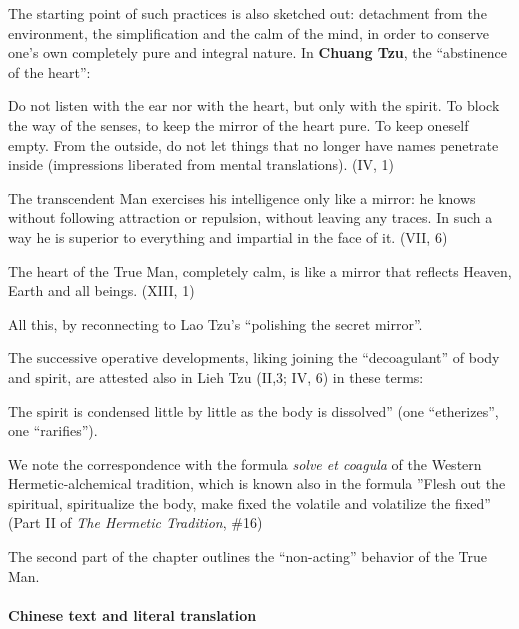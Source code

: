 The starting point of such practices is also sketched out: detachment from the environment, the simplification and the calm of the mind, in order to conserve one's own completely pure and integral nature. In \textbf{Chuang Tzu}, the ``abstinence of the heart'':


\begin{quotex}
Do not listen with the ear nor with the heart, but only with the spirit. To block the way of the senses, to keep the mirror of the heart pure. To keep oneself empty. From the outside, do not let things that no longer have names penetrate inside (impressions liberated from mental translations). (IV, 1)
\end{quotex}


\begin{quotex}
The transcendent Man exercises his intelligence only like a mirror: he knows without following attraction or repulsion, without leaving any traces. In such a way he is superior to everything and impartial in the face of it. (VII, 6)
\end{quotex}


\begin{quotex}
The heart of the True Man, completely calm, is like a mirror that reflects Heaven, Earth and all beings. (XIII, 1)
\end{quotex}


All this, by reconnecting to Lao Tzu's ``polishing the secret mirror''.

The successive operative developments, liking joining the ``decoagulant'' of body and spirit, are attested also in Lieh Tzu (II,3; IV, 6) in these terms:

\begin{quotex}
The spirit is condensed little by little as the body is dissolved'' (one ``etherizes'', one ``rarifies'').
\end{quotex}


We note the correspondence with the formula \emph{solve et coagula} of the Western Hermetic-alchemical tradition, which is known also in the formula ''Flesh out the spiritual, spiritualize the body, make fixed the volatile and volatilize the fixed'' (Part II of \emph{The Hermetic Tradition}, \#16)

The second part of the chapter outlines the ``non-acting'' behavior of the True Man.

\paragraph{Chinese text and literal translation}


